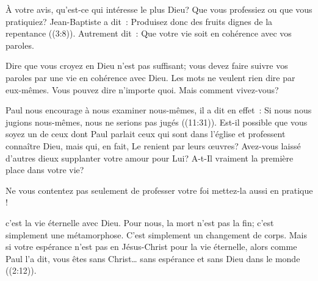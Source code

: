 À votre avis, qu'est-ce qui intéresse le plus Dieu?
 Que vous professiez ou que vous pratiquiez?
 Jean-Baptiste a dit~: 
 \og Produisez donc des fruits dignes de la repentance \fg{}
 ((3:8)).
 Autrement dit~: 
 \og Que votre vie soit en cohérence avec vos paroles. \fg{}


Dire que vous croyez en Dieu n'est pas suffisant;
 vous devez faire suivre vos paroles par une vie en cohérence avec Dieu.
 Les mots ne veulent rien dire par eux-mêmes. Vous pouvez dire n'importe quoi.
 Mais  comment vivez-vous? 

Paul nous encourage à nous examiner nous-mêmes,
 il a dit en effet~: 
 \og Si nous nous jugions nous-mêmes, nous ne serions pas jugés \fg{}
 ((11:31)).
 Est-il possible que vous soyez un de ceux dont Paul parlait
 \ocadr ceux qui sont dans l'église et professent connaître Dieu, mais qui,
 en fait, Le renient par leurs œuvres? Avez-vous laissé d'autres dieux
 supplanter votre amour pour Lui?
 A-t-Il vraiment la première place dans votre vie? 

Ne vous contentez pas seulement de professer votre foi
 \ocadr mettez-la 
 aussi en pratique ! 

\dvrule






 c'est la vie éternelle avec Dieu.
 Pour nous, la mort n'est pas la fin; c'est simplement une métamorphose.
 C'est simplement un changement de corps. Mais si votre espérance n'est pas
 en Jésus-Christ pour la vie éternelle, alors comme Paul l'a dit, vous êtes
 \og sans Christ\dots{} sans espérance et sans Dieu dans le monde \fg{}
 ((2:12)). 

